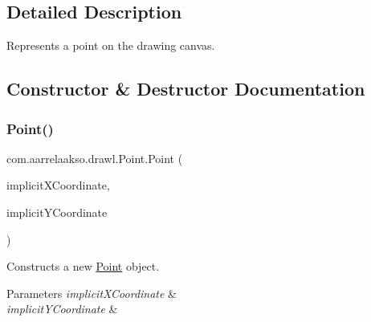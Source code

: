 \subsection{Detailed Description}
Represents a point on the drawing canvas. 

\subsection{Constructor \& Destructor Documentation}
\mbox{\label{classcom_1_1aarrelaakso_1_1drawl_1_1_point_a934b3150ce40f5da49f10ed45a957e32}} 
\subsubsection{\texorpdfstring{Point()}{Point()}\hspace{0.1cm}{\footnotesize\ttfamily [1/2]}}
{\footnotesize\ttfamily com.\+aarrelaakso.\+drawl.\+Point.\+Point (\begin{DoxyParamCaption}\item[{\hyperlink{classcom_1_1aarrelaakso_1_1drawl_1_1_drawl_number}{Drawl\+Number}}]{implicit\+X\+Coordinate,  }\item[{\hyperlink{classcom_1_1aarrelaakso_1_1drawl_1_1_drawl_number}{Drawl\+Number}}]{implicit\+Y\+Coordinate }\end{DoxyParamCaption})\hspace{0.3cm}{\ttfamily [protected]}}



Constructs a new \hyperlink{classcom_1_1aarrelaakso_1_1drawl_1_1_point}{Point} object. 


\begin{DoxyParams}{Parameters}
{\em implicit\+X\+Coordinate} & \\
\hline
{\em implicit\+Y\+Coordinate} & \\
\hline
\end{DoxyParams}
\mbox{\label{classcom_1_1aarrelaakso_1_1drawl_1_1_point_a3160ea0fd6d9632ccc4fcefe15680e8d}} 
